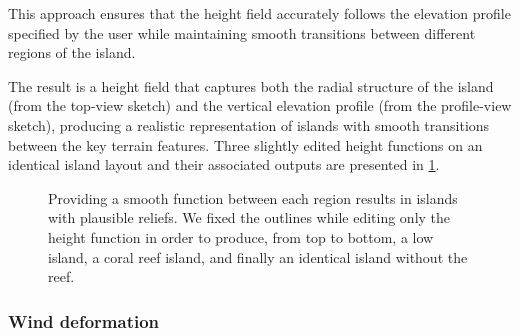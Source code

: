 This approach ensures that the height field accurately follows the elevation profile specified by the user while maintaining smooth transitions between different regions of the island.


The result is a height field that captures both the radial structure of the island (from the top-view sketch) and the vertical elevation profile (from the profile-view sketch), producing a realistic representation of islands with smooth transitions between the key terrain features. Three slightly edited height functions on an identical island layout and their associated outputs are presented in \cref{fig:coral-island-procedural-smooth-heights}.

\begin{figure}[H]
    \caption{Providing a smooth function between each region results in islands with plausible reliefs. We fixed the outlines while editing only the height function in order to produce, from top to bottom, a low island, a coral reef island, and finally an identical island without the reef.}
    \label{fig:coral-island-procedural-smooth-heights}
\end{figure}

\subsubsection{Wind deformation}
\label{sec:coral-island-wind-deformation}


